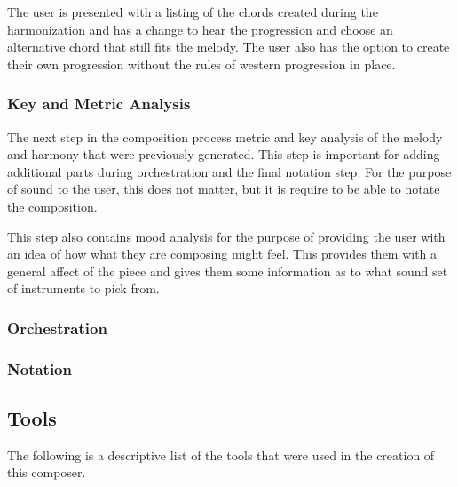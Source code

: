 The user is presented with a listing of the chords created during the harmonization and has a change to hear the progression and choose an alternative chord that still fits the melody.  The user also has the option to create their own progression without the rules of western progression in place.

\subsubsection{Key and Metric Analysis}
\label{subsubsec:analysis}

The next step in the composition process metric and key analysis of the melody and harmony that were previously generated.  This step is important for adding additional parts during orchestration and the final notation step.  For the purpose of sound to the user, this does not matter, but it is require to be able to notate the composition.

\vspace{\baselineskip}

This step also contains mood analysis for the purpose of providing the user with an idea of how what they are composing might feel.  This provides them with a general affect of the piece and gives them some information as to what sound set of instruments to pick from.

\subsubsection{Orchestration}
\label{subsubsec:orchestration}

\subsubsection{Notation}
\label{subsubsec:notation}

\subsection{Tools}
\label{subsec:tools}

The following is a descriptive list of the tools that were used in the creation of this composer.

